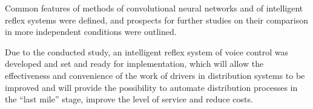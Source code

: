 Common features of methods of convolutional neural networks and of intelligent reflex systems were defined, and prospects for further studies on their comparison in more independent conditions were outlined. 

Due to the conducted study, an intelligent reflex system of voice control was developed and set and ready for implementation, which will allow the effectiveness and convenience of the work of drivers in distribution systems to be improved and will provide the possibility to automate distribution processes in the “last mile” stage, improve the level of service and reduce costs. 

